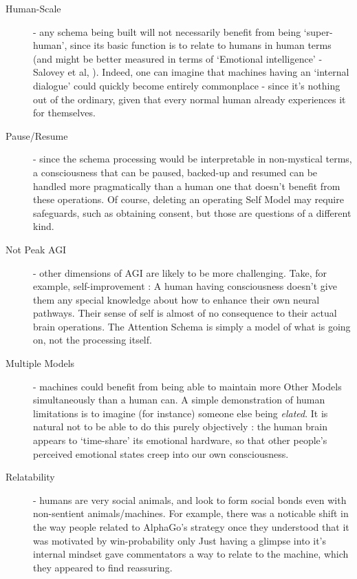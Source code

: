 \documentclass[citeauthoryear]{llncs}
\begin{document}
\begin{description}

\item[Human-Scale] - any schema being built will not necessarily
benefit from being `super-human', since its basic function is to relate to
humans in human terms (and might be better measured in terms of `Emotional intelligence' - 
Salovey et al, \cite{EmotionalIntelligence}).
%
Indeed, one can imagine that machines having an `internal dialogue' could
quickly become entirely commonplace - since it's nothing out of the ordinary, 
given that every normal human already experiences it for themselves.

\item[Pause/Resume] - since the schema processing would be interpretable
in non-mystical terms, a consciousness that can be paused, backed-up and resumed 
can be handled more pragmatically than a human one that doesn't benefit from these
operations.  
%
Of course, deleting an operating Self Model may require safeguards, such as obtaining
consent, but those are questions of a different kind.

\item[Not Peak AGI] - other dimensions of AGI are likely to be more challenging.
Take, for example, self-improvement : A human having consciousness doesn't 
give them any special knowledge about how to enhance their own neural pathways.
Their sense of self is almost of no consequence to their actual brain operations.
The Attention Schema is simply a model of what is going on, not the processing
itself. 

\item[Multiple Models] - machines could benefit from being able to maintain
more Other Models simultaneously than a human can.  A simple demonstration of 
human limitations is to imagine (for instance) someone else being \emph{elated}.  
It is natural not to be able to do this purely objectively : the human brain 
appears to `time-share' its emotional hardware, so that other people's perceived 
emotional states creep into our own consciousness.

\item[Relatability] - humans are very social animals, and look to form 
social bonds even with non-sentient animals/machines.  For example, 
there was a noticable shift in the way people related to AlphaGo's strategy 
once they understood that it was motivated by win-probability only
Just having a glimpse into it's internal mindset gave commentators a way to 
relate to the machine, which they appeared to find reassuring.


\end{description}
\end{document}
